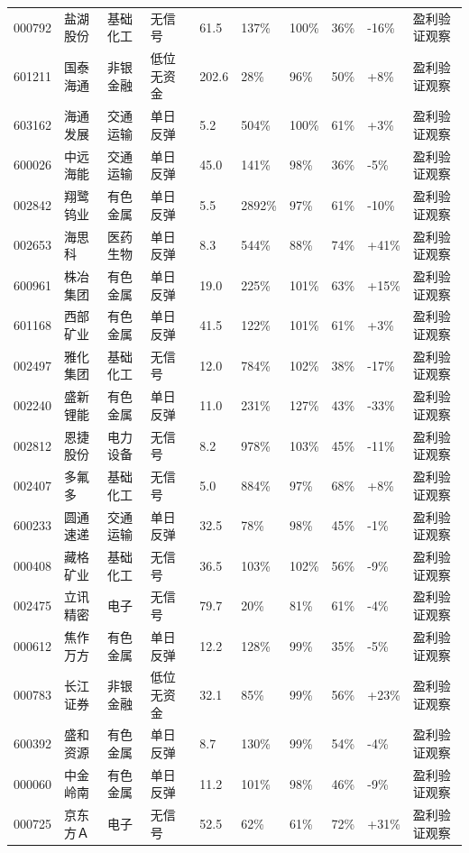 \begin{longtable}{L{1.05cm}L{1.55cm}L{1.45cm}L{1.25cm}R{0.90cm}R{0.90cm}R{0.90cm}R{0.95cm}R{0.95cm}L{2.05cm}}
000792 & 盐湖股份 & 基础化工 & 无信号 & 61.5 & 137\% & 100\% & 36\% & -16\% & 盈利验证观察 \\
601211 & 国泰海通 & 非银金融 & 低位无资金 & 202.6 & 28\% & 96\% & 50\% & +8\% & 盈利验证观察 \\
603162 & 海通发展 & 交通运输 & 单日反弹 & 5.2 & 504\% & 100\% & 61\% & +3\% & 盈利验证观察 \\
600026 & 中远海能 & 交通运输 & 单日反弹 & 45.0 & 141\% & 98\% & 36\% & -5\% & 盈利验证观察 \\
002842 & 翔鹭钨业 & 有色金属 & 单日反弹 & 5.5 & 2892\% & 97\% & 61\% & -10\% & 盈利验证观察 \\
002653 & 海思科 & 医药生物 & 单日反弹 & 8.3 & 544\% & 88\% & 74\% & +41\% & 盈利验证观察 \\
600961 & 株冶集团 & 有色金属 & 单日反弹 & 19.0 & 225\% & 101\% & 63\% & +15\% & 盈利验证观察 \\
601168 & 西部矿业 & 有色金属 & 单日反弹 & 41.5 & 122\% & 101\% & 61\% & +3\% & 盈利验证观察 \\
002497 & 雅化集团 & 基础化工 & 无信号 & 12.0 & 784\% & 102\% & 38\% & -17\% & 盈利验证观察 \\
002240 & 盛新锂能 & 有色金属 & 单日反弹 & 11.0 & 231\% & 127\% & 43\% & -33\% & 盈利验证观察 \\
002812 & 恩捷股份 & 电力设备 & 无信号 & 8.2 & 978\% & 103\% & 45\% & -11\% & 盈利验证观察 \\
002407 & 多氟多 & 基础化工 & 无信号 & 5.0 & 884\% & 97\% & 68\% & +8\% & 盈利验证观察 \\
600233 & 圆通速递 & 交通运输 & 单日反弹 & 32.5 & 78\% & 98\% & 45\% & -1\% & 盈利验证观察 \\
000408 & 藏格矿业 & 基础化工 & 无信号 & 36.5 & 103\% & 102\% & 56\% & -9\% & 盈利验证观察 \\
002475 & 立讯精密 & 电子 & 无信号 & 79.7 & 20\% & 81\% & 61\% & -4\% & 盈利验证观察 \\
000612 & 焦作万方 & 有色金属 & 单日反弹 & 12.2 & 128\% & 99\% & 35\% & -5\% & 盈利验证观察 \\
000783 & 长江证券 & 非银金融 & 低位无资金 & 32.1 & 85\% & 99\% & 56\% & +23\% & 盈利验证观察 \\
600392 & 盛和资源 & 有色金属 & 单日反弹 & 8.7 & 130\% & 99\% & 54\% & -4\% & 盈利验证观察 \\
000060 & 中金岭南 & 有色金属 & 单日反弹 & 11.2 & 101\% & 98\% & 46\% & -9\% & 盈利验证观察 \\
000725 & 京东方Ａ & 电子 & 无信号 & 52.5 & 62\% & 61\% & 72\% & +31\% & 盈利验证观察 \\

\end{longtable}
